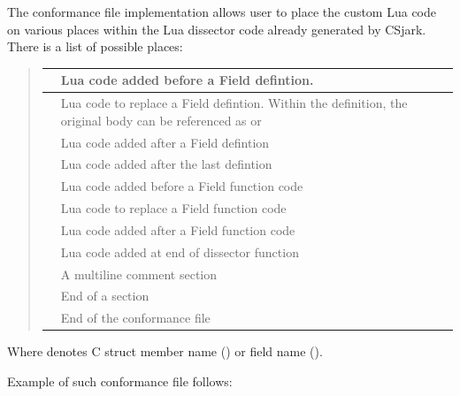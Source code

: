 \documentclass[A4paper,10pt,english]{sphinxmanual}
\begin{document}
The conformance file implementation allows user to place the custom Lua code on various places within the Lua dissector code already generated by CSjark. There is a list of possible places:
\begin{quote}

\setlength{\tymin}{70pt}
\begin{tabulary}{\textwidth}{|L|L|}
\hline

 & 
Lua code added before a Field defintion.
\\\hline

 & 
Lua code to replace a Field defintion. Within the definition, the original body can be referenced as  or 
\\\hline

 & 
Lua code added after a Field defintion
\\\hline

 & 
Lua code added after the last defintion
\\\hline

 & 
Lua code added before a Field function code
\\\hline

 & 
Lua code to replace a Field function code
\\\hline

 & 
Lua code added after a Field function code
\\\hline

 & 
Lua code added at end of dissector function
\\\hline

 & 
A multiline comment section
\\\hline

 & 
End of a section
\\\hline

 & 
End of the conformance file
\\\hline
\end{tabulary}

\end{quote}

Where  denotes C struct member name () or field name ().

Example of such conformance file follows:
\end{document}
